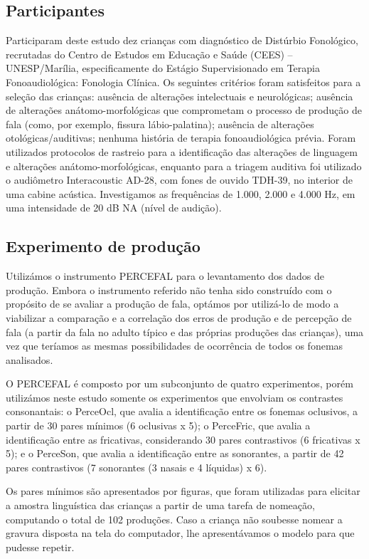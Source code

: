\documentclass[output=paper,colorlinks,citecolor=brown,booklanguage=portuguese]{langscibook}
\begin{document}
\subsection{Participantes}
Participaram deste estudo dez crianças com diagnóstico de Distúrbio Fonológico, recrutadas do Centro de Estudos em Educação e Saúde (CEES) – UNESP/Marília, especificamente do Estágio Supervisionado em Terapia Fonoaudiológica: Fonologia Clínica. Os seguintes critérios foram satisfeitos para a seleção das crianças: ausência de alterações intelectuais e neurológicas; ausência de alterações anátomo-morfológicas que comprometam o processo de produção de fala (como, por exemplo, fissura lábio-palatina); ausência de alterações otológicas/auditivas; nenhuma história de terapia fonoaudiológica prévia. Foram utilizados protocolos de rastreio para a identificação das alterações de linguagem e alterações anátomo-morfológicas, enquanto para a triagem auditiva foi utilizado o audiômetro Interacoustic AD-28, com fones de ouvido TDH-39, no interior de uma cabine acústica. Investigamos as frequências de 1.000, 2.000 e 4.000 Hz, em uma intensidade de 20 dB NA (nível de audição).

\subsection{Experimento de produção}
Utilizámos o instrumento PERCEFAL \citep{Berti2017} para o levantamento dos dados de produção. Embora o instrumento referido não tenha sido construído com o propósito de se avaliar a produção de fala, optámos por utilizá-lo de modo a viabilizar a comparação e a correlação dos erros de produção e de percepção de fala (a partir da fala no adulto típico e das próprias produções das crianças), uma vez que teríamos as mesmas possibilidades de ocorrência de todos os fonemas analisados.

O PERCEFAL é composto por um subconjunto de quatro experimentos, porém utilizámos neste estudo somente os experimentos que envolviam os contrastes consonantais: o PerceOcl, que avalia a identificação entre os fonemas oclusivos, a partir de 30 pares mínimos (6 oclusivas x 5); o PerceFric, que avalia a identificação entre as fricativas, considerando 30 pares contrastivos (6 fricativas x 5); e o PerceSon, que avalia a identificação entre as sonorantes, a partir de 42 pares contrastivos (7 sonorantes (3 nasais e 4 líquidas) x 6).

Os pares mínimos são apresentados por figuras, que foram utilizadas para elicitar a amostra linguística das crianças a partir de uma tarefa de nomeação, computando o total de 102 produções. Caso a criança não soubesse nomear a gravura disposta na tela do computador, lhe apresentávamos o modelo para que pudesse repetir. 
\end{document}
